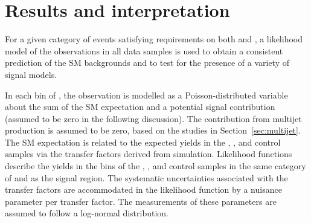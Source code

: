 \section{Results and interpretation}
\label{sec:interpretation}

For a given category of events satisfying requirements on both \njet
and \nb, a likelihood model of the observations in all data samples is
used to obtain a consistent prediction of the SM backgrounds and to
test for the presence of a variety of signal models.%


In each bin of \scalht, the observation is modelled as a
Poisson-distributed variable about the sum of the SM expectation and a
potential signal contribution (assumed to be zero in the following
discussion). The contribution from multijet production is assumed
to be zero, based on the studies in Section~\ref{sec:multijet}. 
The SM expectation is related to the expected yields in
the \mj, \mmj, and \gj control samples via the transfer factors
derived from simulation. Likelihood functions %
describe the yields in the \scalht bins
of the \mj, \mmj, and \gj control samples in the same category of
\njet and \nb as the signal region. %
The systematic uncertainties
associated with the transfer factors are accommodated in the
likelihood function by a nuisance parameter per transfer factor. The
measurements of these parameters are assumed to follow a log-normal
distribution.


